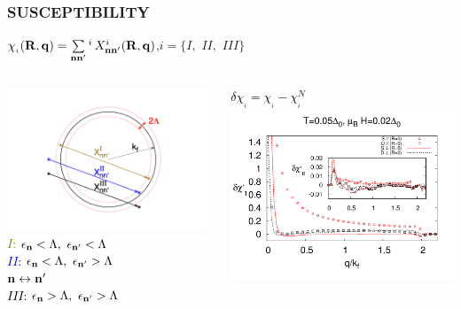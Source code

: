 \documentclass[amssymb,amsmath]{beamer}
\newcommand{\black}{\textcolor{black}}
\newcommand{\blue}{\textcolor{blue}}
\newcommand{\olive}{\textcolor{olive}}
\begin{document}
\begin{frame} \frametitle{SUSCEPTIBILITY} 
$\chi_{_i}({\bf R},{\bf q})=\sum\limits_{{\bf n}{\bf n}'} {}^{i}\, X^{i}_{{\bf n}{\bf n}'}({\bf R},{\bf q})$,\quad $i=\{I,\,\, II,\,\, III\}$
\begin{columns}
\begin{column}{0.4\textwidth}
	\includegraphics[scale=0.18]{./figures/sus_connection.png}\\
	\olive{$I$: $\epsilon_{{\bf n}}< \Lambda,\,\,\epsilon_{{\bf n}'} < \Lambda$} \\
	\blue{$II$: $\epsilon_{{\bf n}}< \Lambda,\,\,\epsilon_{{\bf n}'} > \Lambda$\\\hspace{1cm} ${\bf n} \leftrightarrow {\bf n}'$} \\
	\black{$III$: $\epsilon_{{\bf n}}> \Lambda,\,\,\epsilon_{{\bf n}'} > \Lambda$}
	
\end{column}
\begin{column}{0.6\textwidth}
\centering
\black{\huge$\delta\chi_{_i} = \chi_{_i} - \chi_{_i}^{N}$}
\includegraphics[scale=0.22]{./figures_3/fig_4/Fig4_delta.png}
\end{column}
\end{columns}
\end{frame}
\end{document}
